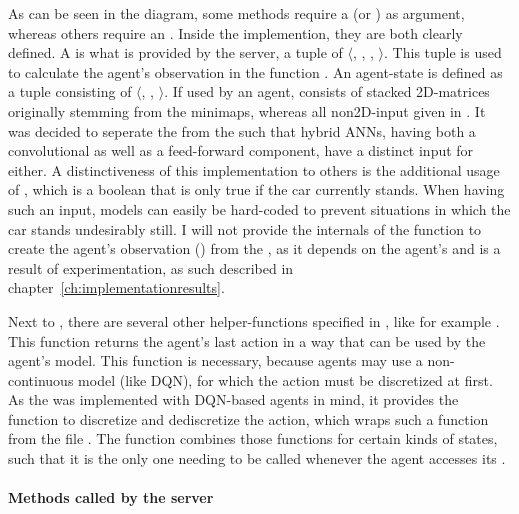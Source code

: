 As can be seen in the diagram, some methods require a  (or ) as argument, whereas others require an . Inside the implemention, they are both clearly defined. A  is what is provided by the server, a tuple of $\langle$, , , $\rangle$. This tuple is used to calculate the agent's observation in the function . An agent-state is defined as a tuple consisting of $\langle$, , $\rangle$. If used by an agent,  consists of stacked 2D-matrices originally stemming from the minimaps, whereas all non2D-input given in . It was decided to seperate the  from the  such that hybrid ANNs, having both a convolutional as well as a feed-forward component, have a distinct input for either. A distinctiveness of this implementation to others is the additional usage of , which is a boolean that is only true if the car currently stands. When having such an input, models can easily be hard-coded to prevent situations in which the car stands undesirably still. I will not provide the internals of the function to create the agent's observation () from the , as it depends on the agent's  and is a result of experimentation, as such described in chapter~\ref{ch:implementationresults}.

Next to , there are several other helper-functions specified in , like for example . This function returns the agent's last action in a way that can be used by the agent's model. This function is necessary, because agents may use a non-continuous model (like DQN), for which the action must be discretized at first. As the  was implemented with DQN-based agents in mind, it provides the function to discretize and dediscretize the action, which wraps such a function from the file . The function  combines those functions for certain kinds of states, such that it is the only one needing to be called whenever the agent accesses its .

\paragraph{Methods called by the server}

